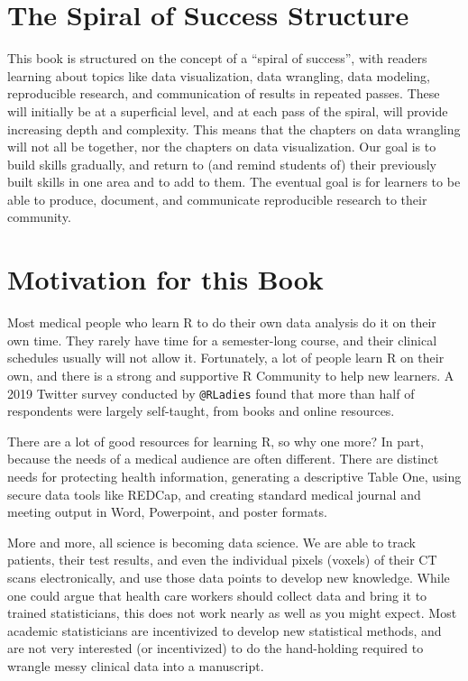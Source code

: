 \documentclass[
]{book}
\begin{document}
\hypertarget{the-spiral-of-success-structure}{%
\section{The Spiral of Success Structure}\label{the-spiral-of-success-structure}}

This book is structured on the concept of a ``spiral of success'', with readers learning about topics like data visualization, data wrangling, data modeling, reproducible research, and communication of results in repeated passes. These will initially be at a superficial level, and at each pass of the spiral, will provide increasing depth and complexity. This means that the chapters on data wrangling will not all be together, nor the chapters on data visualization. Our goal is to build skills gradually, and return to (and remind students of) their previously built skills in one area and to add to them. The eventual goal is for learners to be able to produce, document, and communicate reproducible research to their community.

\hypertarget{motivation-for-this-book}{%
\section{Motivation for this Book}\label{motivation-for-this-book}}

Most medical people who learn R to do their own data analysis do it on their own time. They rarely have time for a semester-long course, and their clinical schedules usually will not allow it. Fortunately, a lot of people learn R on their own, and there is a strong and supportive R Community to help new learners. A 2019 Twitter survey conducted by \texttt{@RLadies} found that more than half of respondents were largely self-taught, from books and online resources.

There are a lot of good resources for learning R, so why one more? In part, because the needs of a medical audience are often different. There are distinct needs for protecting health information, generating a descriptive Table One, using secure data tools like REDCap, and creating standard medical journal and meeting output in Word, Powerpoint, and poster formats.

More and more, all science is becoming data science. We are able to track patients, their test results, and even the individual pixels (voxels) of their CT scans electronically, and use those data points to develop new knowledge. While one could argue that health care workers should collect data and bring it to trained statisticians, this does not work nearly as well as you might expect. Most academic statisticians are incentivized to develop new statistical methods, and are not very interested (or incentivized) to do the hand-holding required to wrangle messy clinical data into a manuscript.
\end{document}
